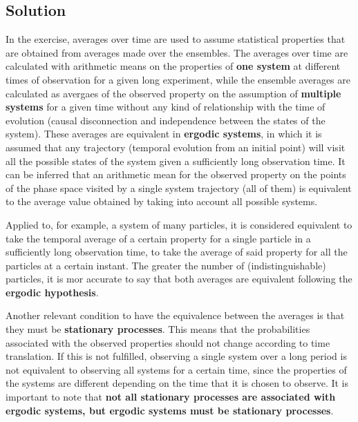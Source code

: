 \documentclass{article}
\begin{document}
\subsection*{Solution}
In the exercise, averages over time are used to assume statistical properties that are obtained from averages made over the ensembles. The averages over time are calculated with arithmetic means on the properties of \textbf{one system} at different times of observation for a given long experiment, while the ensemble averages are calculated as avergaes of the observed property on the assumption of \textbf{multiple systems} for a given time without any kind of relationship with the time of evolution (causal disconnection and independence between the states of the system). These averages are equivalent in  \textbf{ergodic systems}, in which it is assumed that any trajectory (temporal evolution from an initial point) will visit all the possible states of the system given a sufficiently long observation time. It can be inferred that an arithmetic mean for the observed property on the points of the phase space visited by a single system trajectory (all of them) is equivalent to the average value obtained by taking into account all possible systems.

Applied to, for example, a system of many particles, it is considered equivalent to take the temporal average of a certain property for a single particle in a sufficiently long observation time, to take the average of said property for all the particles at a certain instant. The greater the number of (indistinguishable) particles,  it is mor accurate to say that both averages are equivalent following the  \textbf{ergodic hypothesis}.

Another relevant condition to have the equivalence between the averages is that they must be  \textbf{stationary processes}. This means that the probabilities associated with the observed properties should not change according to time translation. If this is not fulfilled, observing a single system over a long period is not equivalent to observing all systems for a certain time, since the properties of the systems are different depending on the time that it is chosen to observe. It is important to note that  \textbf{not all stationary processes are associated with ergodic systems, but ergodic systems must be stationary processes}.
\end{document}
